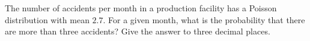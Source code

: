 The number of accidents per month in a production facility has a Poisson distribution with mean $2.7$. For a given month, what is the probability that there are more than three accidents? Give the answer to three decimal places.

